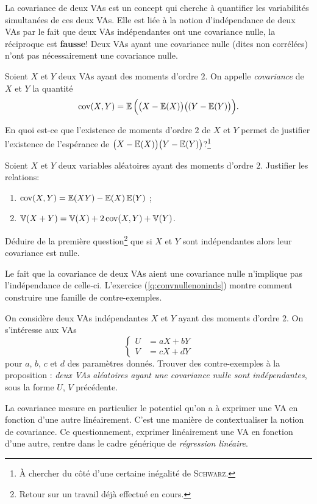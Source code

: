 \documentclass[11pt, a4paper]{article}
\begin{document}
La covariance de deux VAs est un concept qui cherche à quantifier les
variabilités simultanées de ces deux VAs. Elle est liée à la notion
d'indépendance de deux VAs par le fait que deux VAs indépendantes ont
une covariance nulle, la réciproque est \textbf{fausse}! Deux VAs
ayant une covariance nulle (dites non corrélées) n'ont pas
nécessairement une covariance nulle.
\begin{defn}
  Soient $X$ et $Y$ deux VAs ayant des moments d'ordre $2$. On appelle
  \emph{covariance} de $X$ et $Y$ la quantité
  \[
    \operatorname{cov}(X, Y) = \operatorname{\mathbb{E}}\Big(\big(X - \operatorname{\mathbb{E}}(X)\big)\big((Y - \operatorname{\mathbb{E}}(Y)\big)\Big).
  \]
\end{defn}
\begin{question}
  En quoi est-ce que l'existence de moments d'ordre $2$ de $X$ et $Y$
  permet de justifier l'existence de l'espérance de
  $\big(X - \operatorname{\mathbb{E}}(X)\big)\big(Y - \operatorname{\mathbb{E}}(Y)\big)$?\footnote{À chercher du
    côté d'une certaine inégalité de \textsc{Schwarz}.}
\end{question}
\begin{question}
  Soient $X$ et $Y$ deux variables aléatoires ayant des moments
  d'ordre $2$. Justifier les relations:
  \begin{enumerate}
  \item $\operatorname{cov}(X, Y) = \operatorname{\mathbb{E}}(XY) - \operatorname{\mathbb{E}}(X)\operatorname{\mathbb{E}}(Y)$ ;
  \item $\operatorname{\mathbb{V}}(X + Y) = \operatorname{\mathbb{V}}(X) + 2\operatorname{cov}(X, Y) + \operatorname{\mathbb{V}}(Y)$.
  \end{enumerate}
  Déduire de la première question\footnote{Retour sur un travail déjà
    effectué en cours.} que si $X$ et $Y$ sont indépendantes alors
  leur covariance est nulle.
\end{question}
\begin{rem}
  Le fait que la covariance de deux VAs aient une covariance nulle
  n'implique pas l'indépendance de celle-ci. L'exercice
  (\ref{q:convnullenoninds}) montre comment construire une famille de
  contre-exemples.
\end{rem}
\begin{question}
  \label{q:convnullenoninds}
  On considère deux VAs indépendantes $X$ et $Y$ ayant des moments
  d'ordre $2$. On s'intéresse aux VAs
  \[
    \left\{
      \begin{matrix}
        U & = aX + bY \\
        V & = cX + dY
      \end{matrix}
    \right.
  \]
  pour $a$, $b$, $c$ et $d$ des paramètres donnés. Trouver des
  contre-exemples à la proposition : \textit{deux VAs aléatoires ayant
    une covariance nulle sont indépendantes}, sous la forme $U$, $V$
  précédente.
\end{question}
La covariance mesure en particulier le potentiel qu'on a à exprimer
une VA en fonction d'une autre linéairement. C'est une manière de
contextualiser la notion de covariance. Ce questionnement, exprimer
linéairement une VA en fonction d'une autre, rentre dans le cadre
générique de \textit{régression linéaire}.
\end{document}
